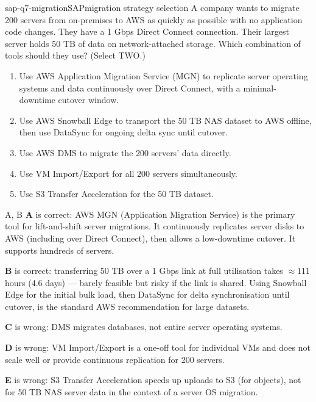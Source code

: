 \begin{question}{sap-q7-migration}{SAP}{migration strategy selection}
A company wants to migrate 200 servers from on-premises to AWS as quickly as possible with no application code changes. They have a 1 Gbps Direct Connect connection. Their largest server holds 50 TB of data on network-attached storage. Which combination of tools should they use? (Select TWO.)

\begin{enumerate}[label=\Alph*.]
  \item Use AWS Application Migration Service (MGN) to replicate server operating systems and data continuously over Direct Connect, with a minimal-downtime cutover window.
  \item Use AWS Snowball Edge to transport the 50 TB NAS dataset to AWS offline, then use DataSync for ongoing delta sync until cutover.
  \item Use AWS DMS to migrate the 200 servers' data directly.
  \item Use VM Import/Export for all 200 servers simultaneously.
  \item Use S3 Transfer Acceleration for the 50 TB dataset.
\end{enumerate}
\end{question}

\begin{answer}{A, B}
\textbf{A} is correct: AWS MGN (Application Migration Service) is the primary tool for lift-and-shift server migrations. It continuously replicates server disks to AWS (including over Direct Connect), then allows a low-downtime cutover. It supports hundreds of servers.

\textbf{B} is correct: transferring 50 TB over a 1 Gbps link at full utilisation takes $\approx$111 hours (4.6 days) --- barely feasible but risky if the link is shared. Using Snowball Edge for the initial bulk load, then DataSync for delta synchronisation until cutover, is the standard AWS recommendation for large datasets.

\textbf{C} is wrong: DMS migrates databases, not entire server operating systems.

\textbf{D} is wrong: VM Import/Export is a one-off tool for individual VMs and does not scale well or provide continuous replication for 200 servers.

\textbf{E} is wrong: S3 Transfer Acceleration speeds up uploads to S3 (for objects), not for 50 TB NAS server data in the context of a server OS migration.
\end{answer}


